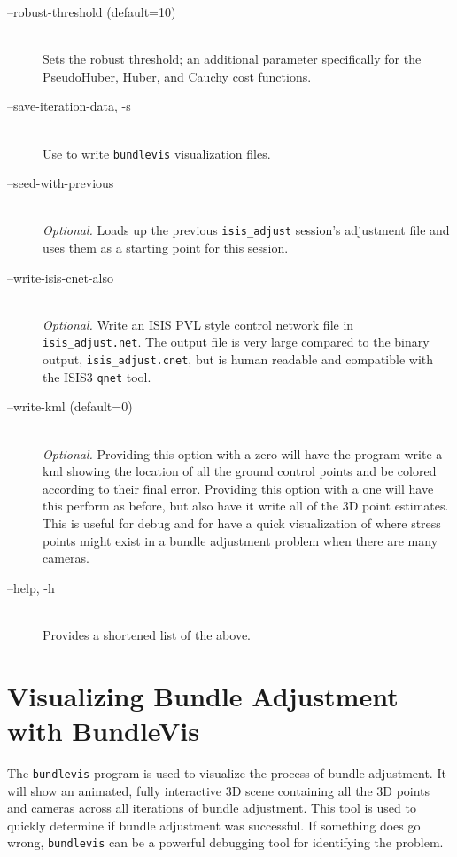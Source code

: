 \begin{description}
\item[--robust-threshold \textnormal{\small{(default=10)}}] \hfill \\
  Sets the robust threshold; an additional parameter specifically for
  the PseudoHuber, Huber, and Cauchy cost functions.

\item[--save-iteration-data, -s] \hfill \\
  Use to write {\tt bundlevis} visualization files.

\item[--seed-with-previous] \hfill \\
  \emph{Optional.} Loads up the previous {\tt isis\_adjust} session's
  adjustment file and uses them as a starting point for this session.

\item[--write-isis-cnet-also] \hfill \\
  \emph{Optional.} Write an ISIS PVL style control network file in
  \texttt{isis\_adjust.net}. The output file is very large compared to
  the binary output, \texttt{isis\_adjust.cnet}, but is human readable
  and compatible with the ISIS3 \texttt{qnet} tool.

\item[--write-kml \textnormal{\small{(default=0)}}] \hfill \\
  \emph{Optional.} Providing this option with a zero will have the
  program write a kml showing the location of all the ground control
  points and be colored according to their final error. Providing this
  option with a one will have this perform as before, but also have it
  write all of the 3D point estimates. This is useful for debug and
  for have a quick visualization of where stress points might exist in
  a bundle adjustment problem when there are many cameras.

\item[--help, -h] \hfill \\
  Provides a shortened list of the above.

\end{description}

\section{Visualizing Bundle Adjustment with BundleVis}

The \texttt{bundlevis} program is used to visualize the process of
bundle adjustment. It will show an animated, fully interactive 3D
scene containing all the 3D points and cameras across all iterations
of bundle adjustment.  This tool is used to quickly determine if
bundle adjustment was successful.  If something does go wrong,
\texttt{bundlevis} can be a powerful debugging tool for identifying
the problem.

